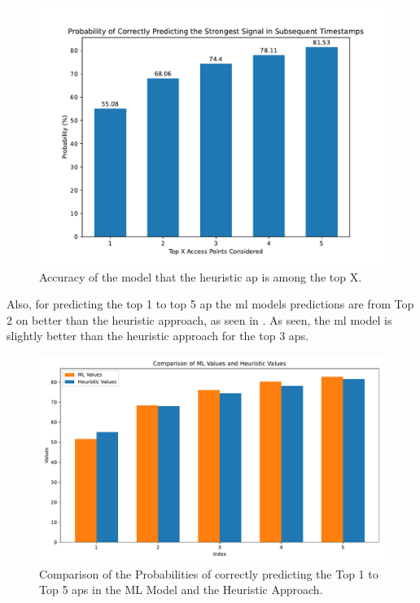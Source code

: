 \begin{figure}[h]
    \centering
    \includegraphics*[scale=0.45]{images/heuristic_plot.pdf}
    \caption{Accuracy of the model that the heuristic \ac{ap} is among the top X.}
    \label{fig:heuristic-approach}
\end{figure}

Also, for predicting the top 1 to top 5 \ac{ap} the \ac{ml} models predictions are from Top 2 on better than the heuristic approach, as seen in .
As seen, the \ac{ml} model is slightly better than the heuristic approach for the top 3 \acp{ap}.

\begin{figure}[h]
    \centering
    \includegraphics*[scale=0.45]{images/comparison_ml_heuristic_1_to_5.pdf}
    \caption{Comparison of the Probabilities of correctly predicting the Top 1 to Top 5 \acp{ap} in the ML Model and the Heuristic Approach.}
    \label{fig:comparison_ml_heuristic_1_to_5}
\end{figure}

